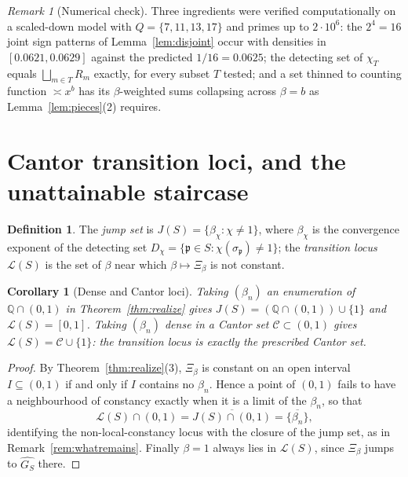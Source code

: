 \documentclass[11pt]{amsart}
\numberwithin{equation}{section}
\newtheorem{corollary}[theorem]{Corollary}
\theoremstyle{definition}
\newtheorem{definition}[theorem]{Definition}
\theoremstyle{remark}
\newtheorem{remark}[theorem]{Remark}
\newcommand{\Q}{\mathbb{Q}}
\newcommand{\cC}{\mathcal{C}}
\newcommand{\pp}{\mathfrak{p}}
\begin{document}
\begin{remark}[Numerical check]\label{rem:numcascade}
Three ingredients were verified computationally on a scaled-down model with
$Q=\{7,11,13,17\}$ and primes up to $2\cdot10^6$: the $2^4=16$ joint sign patterns of
Lemma~\ref{lem:disjoint} occur with densities in $[0.0621,0.0629]$ against the predicted
$1/16=0.0625$; the detecting set of $\chi_T$ equals $\bigsqcup_{m\in T}R_m$ exactly, for
every subset $T$ tested; and a set thinned to counting function $\asymp x^{b}$ has its
$\beta$-weighted sums collapsing across $\beta=b$ as Lemma~\ref{lem:pieces}(2) requires.
\end{remark}

\section{Cantor transition loci, and the unattainable staircase}\label{sec:cantor}

\begin{definition}\label{def:locus}
The \emph{jump set} is $J(S)=\{\beta_\chi:\chi\ne1\}$, where $\beta_\chi$ is the convergence
exponent of the detecting set $D_\chi=\{\pp\in S:\chi(\sigma_\pp)\ne1\}$; the
\emph{transition locus} $\mathcal L(S)$ is the set of $\beta$ near which $\beta\mapsto\Xi_\beta$
is not constant.
\end{definition}

\begin{corollary}[Dense and Cantor loci]\label{cor:loci}
Taking $(\beta_n)$ an enumeration of $\Q\cap(0,1)$ in Theorem~\ref{thm:realize} gives
$J(S)=(\Q\cap(0,1))\cup\{1\}$ and $\mathcal L(S)=[0,1]$. Taking $(\beta_n)$ dense in a Cantor
set $\cC\subset(0,1)$ gives $\mathcal L(S)=\cC\cup\{1\}$: the transition locus is exactly the
prescribed Cantor set.
\end{corollary}

\begin{proof}
By Theorem~\ref{thm:realize}(3), $\Xi_\beta$ is constant on an open interval
$I\subseteq(0,1)$ if and only if $I$ contains no $\beta_n$. Hence a point of $(0,1)$ fails to
have a neighbourhood of constancy exactly when it is a limit of the $\beta_n$, so that
\[
\mathcal L(S)\cap(0,1)=\overline{J(S)\cap(0,1)}=\overline{\{\beta_n\}} ,
\]
identifying the non-local-constancy locus with the closure of the jump set, as in
Remark~\ref{rem:whatremains}. Finally $\beta=1$ always lies in $\mathcal L(S)$, since
$\Xi_\beta$ jumps to $\widehat{G_S}$ there.
\end{proof}
\end{document}

